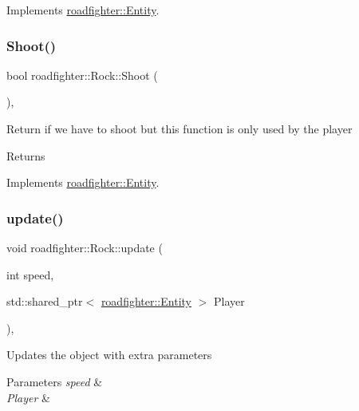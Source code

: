 Implements \hyperlink{classroadfighter_1_1Entity_a07e973f0fa941a69e749629716877692}{roadfighter\+::\+Entity}.

\mbox{\label{classroadfighter_1_1Rock_a1bcf89f9c386a3b248033ba3f0329e9c}} 
\subsubsection{\texorpdfstring{Shoot()}{Shoot()}}
{\footnotesize\ttfamily bool roadfighter\+::\+Rock\+::\+Shoot (\begin{DoxyParamCaption}{ }\end{DoxyParamCaption})\hspace{0.3cm}{\ttfamily [override]}, {\ttfamily [virtual]}}

Return if we have to shoot but this function is only used by the player \begin{DoxyReturn}{Returns}

\end{DoxyReturn}


Implements \hyperlink{classroadfighter_1_1Entity_ad0ecaa0539db252e591da83814251509}{roadfighter\+::\+Entity}.

\mbox{\label{classroadfighter_1_1Rock_af9817c01175d300ca7be67e2b5e3952e}} 
\subsubsection{\texorpdfstring{update()}{update()}\hspace{0.1cm}{\footnotesize\ttfamily [1/2]}}
{\footnotesize\ttfamily void roadfighter\+::\+Rock\+::update (\begin{DoxyParamCaption}\item[{int}]{speed,  }\item[{std\+::shared\+\_\+ptr$<$ \hyperlink{classroadfighter_1_1Entity}{roadfighter\+::\+Entity} $>$}]{Player }\end{DoxyParamCaption})\hspace{0.3cm}{\ttfamily [override]}, {\ttfamily [virtual]}}

Updates the object with extra parameters 
\begin{DoxyParams}{Parameters}
{\em speed} & \\
\hline
{\em Player} & \\
\hline
\end{DoxyParams}


